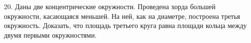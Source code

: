 20. Даны две концентрические окружности. Проведена хорда большей окружности, касающаяся меньшей. На ней, как на диаметре, построена третья окружность. Доказать, что площадь третьего круга равна площади кольца между двумя первыми окружностями.\\
